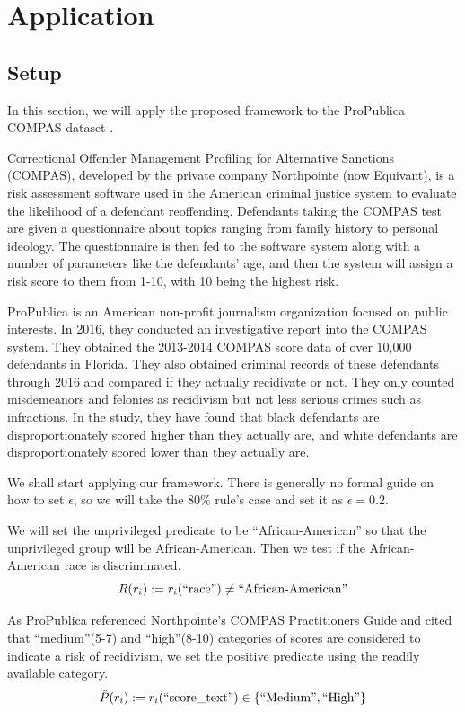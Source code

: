 \documentclass[conference]{IEEEtran}
\begin{document}
\section{Application}
\subsection{Setup}
\label{sec:app}
In this section, we will apply the proposed framework to the ProPublica COMPAS dataset \cite{angwin2016machine,larson2016compas,larson2016propublica}.

Correctional Offender Management Profiling for Alternative Sanctions (COMPAS), developed by the private company Northpointe (now Equivant), is a risk assessment software used in the American criminal justice system to evaluate the likelihood of a defendant reoffending. Defendants taking the COMPAS test are given a questionnaire about topics ranging from family history to personal ideology. The questionnaire is then fed to the software system along with a number of parameters like the defendants' age, and then the system will assign a risk score to them from 1-10, with 10 being the highest risk.

ProPublica is an American non-profit journalism organization focused on public interests. In 2016, they conducted an investigative report into the COMPAS system. They obtained the 2013-2014 COMPAS score data of over 10,000 defendants in Florida. They also obtained criminal records of these defendants through 2016 and compared if they actually recidivate or not. They only counted misdemeanors and felonies as recidivism but not less serious crimes such as infractions. In the study, they have found that black defendants are disproportionately scored higher than they actually are, and white defendants are disproportionately scored lower than they actually are.

We shall start applying our framework. There is generally no formal guide on how to set $\epsilon$, so we will take the 80\% rule's case and set it as $\epsilon = 0.2$.

We will set the unprivileged predicate to be ``African-American'' so that the unprivileged group will be African-American. Then we test if the African-American race is discriminated.
\[
    R(r_i) := r_i(\text{``race''}) \neq \text{``African-American''}
\]

As ProPublica referenced Northpointe's COMPAS Practitioners Guide and cited that ``medium''(5-7) and ``high''(8-10) categories of scores are considered to indicate a risk of recidivism, we set the positive predicate using the readily available category.
\[
    \hat{P}(r_i) := r_i(\text{``score\_text''}) \in \{\text{``Medium''},\text{``High''}\}
\]
\end{document}
